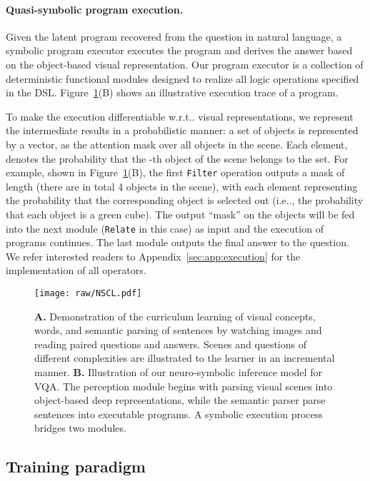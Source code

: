 \documentclass{article} \usepackage{iclr2019_conference,times}
\makeatletter
\newcommand{\fig}[1]{Figure~\ref{#1}}
\DeclareRobustCommand\onedot{\futurelet\@let@token\@onedot}
\def\@onedot{\ifx\@let@token.\else.\null\fi\xspace}
\def\ie{i.e\onedot} \def\Ie{I.e\onedot}
\def\wrt{w.r.t\onedot} \def\dof{d.o.f\onedot}
\newcommand{\myparagraph}[1]{\vspace{-3pt}\paragraph{#1}}
\makeatother
\begin{document}
\myparagraph{Quasi-symbolic program execution.}

Given the latent program recovered from the question in natural language, a symbolic program executor executes the program and derives the answer based on the object-based visual representation. Our program executor is a collection of deterministic functional modules designed to realize all logic operations specified in the DSL. \fig{fig:nscl}(B) shows an illustrative execution trace of a program.

To make the execution differentiable \wrt visual representations, we represent the intermediate results in a probabilistic manner: a set of objects is represented by a vector, as the attention mask over all objects in the scene. Each element,  denotes the probability that the -th object of the scene belongs to the set.
For example, shown in \fig{fig:nscl}(B), the first \texttt{Filter} operation outputs a mask of length  (there are in total 4 objects in the scene), with each element representing the probability that the corresponding object is selected out (\ie, the probability that each object is a green cube). The output ``mask'' on the objects will be fed into the next module (\texttt{Relate} in this case) as input and the execution of programs continues. The last module outputs the final answer to the question. We refer interested readers to Appendix~\ref{sec:app:execution} for the implementation of all operators.






\begin{figure}[t]
\centering
\texttt{[image: raw/NSCL.pdf]}
\vspace{-15pt}
\caption{{\bf A.} Demonstration of the curriculum learning of visual concepts, words, and semantic parsing of sentences by watching images and reading paired questions and answers. Scenes and questions of different complexities are illustrated to the learner in an incremental manner. {\bf B.} Illustration of our neuro-symbolic inference model for VQA. The perception module begins with parsing visual scenes into object-based deep representations, while the semantic parser parse sentences into executable programs. A symbolic execution process bridges two modules.}
\vspace{-5pt}
\label{fig:nscl}
\end{figure}
 
\subsection{Training paradigm}
\end{document}
